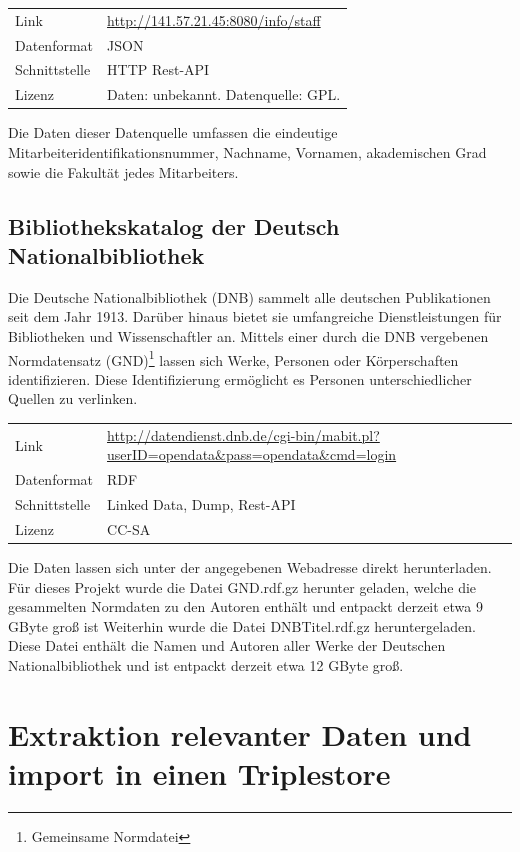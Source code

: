 \documentclass[parskip]{scrartcl}
\begin{document}
\begin{tabular}{l|p{10cm}}
	Link & \url{http://141.57.21.45:8080/info/staff}\\
 	Datenformat & JSON \\
 	Schnittstelle & HTTP Rest-API \\
 	Lizenz & Daten: unbekannt. Datenquelle: GPL.\\
\end{tabular}

Die Daten dieser Datenquelle umfassen die eindeutige Mitarbeiteridentifikationsnummer, Nachname, Vornamen, akademischen Grad sowie die Fakultät jedes Mitarbeiters.


\subsection{Bibliothekskatalog der Deutsch Nationalbibliothek}

Die Deutsche Nationalbibliothek (DNB) sammelt alle deutschen Publikationen seit dem Jahr 1913. Darüber hinaus bietet sie umfangreiche Dienstleistungen für Bibliotheken und Wissenschaftler an. Mittels einer durch die DNB vergebenen Normdatensatz (GND)\footnote{Gemeinsame Normdatei} lassen sich Werke, Personen oder Körperschaften identifizieren. Diese Identifizierung ermöglicht es Personen unterschiedlicher Quellen zu verlinken.

\begin{tabular}{l|p{10cm}}
	Link & \url{http://datendienst.dnb.de/cgi-bin/mabit.pl?userID=opendata&pass=opendata&cmd=login} \\
 	Datenformat & RDF \\
 	Schnittstelle & Linked Data, Dump, Rest-API \\
 	Lizenz & CC-SA \\
\end{tabular}

Die Daten lassen sich unter der angegebenen Webadresse direkt herunterladen. Für dieses Projekt wurde die Datei GND.rdf.gz herunter geladen, welche die gesammelten Normdaten zu den Autoren enthält und entpackt derzeit etwa 9 GByte groß ist
Weiterhin wurde die Datei DNBTitel.rdf.gz heruntergeladen. Diese Datei enthält die Namen und Autoren aller Werke der Deutschen Nationalbibliothek und ist entpackt derzeit etwa 12 GByte groß. 

\section{Extraktion relevanter Daten und import in einen Triplestore }
\end{document}
